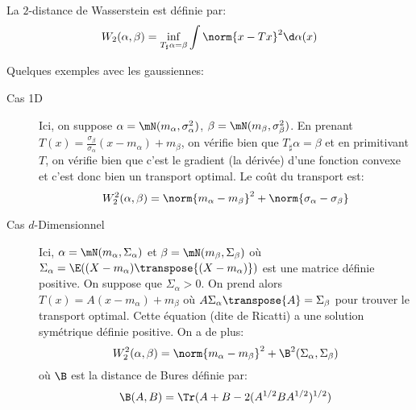 \begin{definition}
	La $2$-distance de Wasserstein est définie par:
	\begin{equation*}
		W_{2}(\alpha, \beta) = \inf_{T_{\sharp}\alpha = \beta} \int \norm{x - Tx}^{2}\d\alpha(x)
	\end{equation*}
\end{definition}

Quelques exemples avec les gaussiennes:
\begin{description}
	\item[Cas 1D] Ici, on suppose $\alpha = \mN(m_{\alpha}, \sigma_{\alpha}^{2})$, $\beta = \mN(m_{\beta}, \sigma_{\beta}^{2})$.
	      En prenant $T(x) = \frac{\sigma_{\beta}}{\sigma_{\alpha}}(x - m_{\alpha}) + m_{\beta}$, on vérifie bien que $T_{\sharp}\alpha = \beta$ et en primitivant $T$, on vérifie bien que c'est le gradient (la dérivée) d'une fonction convexe et c'est donc bien un transport optimal.
	      Le coût du transport est:
	      \begin{equation*}
		      W_{2}^{2}(\alpha, \beta) = \norm{m_{\alpha} - m_{\beta}}^{2} + \norm{\sigma_{\alpha} - \sigma_{\beta}}
	      \end{equation*}
	\item[Cas $d$-Dimensionnel] Ici, $\alpha = \mN(m_{\alpha}, \Sigma_{\alpha})$ et $\beta = \mN(m_{\beta}, \Sigma_{\beta})$ où $\Sigma_{\alpha} = \E((X- m_{\alpha})\transpose{(X-m_{\alpha})})$ est une matrice définie positive.
	      On suppose que $\Sigma_{\alpha} > 0$.
	      On prend alors $T(x) = A(x - m_{\alpha}) + m_{\beta}$ où $A\Sigma_{\alpha}\transpose{A} = \Sigma_{\beta}$ pour trouver le transport optimal.
	      Cette équation (dite de Ricatti) a une solution symétrique définie positive.
	      On a de plus:
	      \begin{equation*}
		      W_{2}^{2}(\alpha, \beta) = \norm{m_{\alpha} - m_{\beta}}^{2} + \B^{2}(\Sigma_{\alpha}, \Sigma_{\beta})
	      \end{equation*}
	      où $\B$ est la distance de Bures définie par:
	      \begin{equation*}
		      \B(A, B) = \Tr(A + B - 2(A^{1/2}BA^{1/2})^{1/2})
	      \end{equation*}
\end{description}

